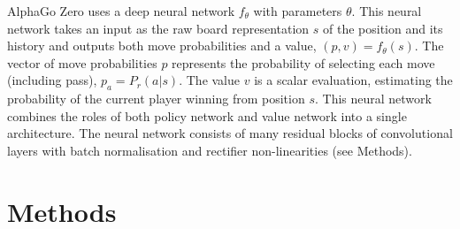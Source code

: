 \documentclass[12pt,a4paper]{article}
\begin{document}
AlphaGo Zero uses a deep neural network \(f_\theta\) with parameters \(\theta\). This neural network takes an input as the raw board representation \(s\) of the position and its history and outputs both move probabilities and a value, \((p, v) = f_\theta(s)\). The vector of move probabilities \(p\) represents the probability of selecting each move (including pass), \(p_a = P_r(a|s)\). The value \(v\) is a scalar evaluation, estimating the probability of the current player winning from position \(s\). This neural network combines the roles of both policy network and value network\cite{AlphaGo} into a single architecture. The neural network consists of many residual blocks\cite{ResNet} of convolutional layers\cite{CNNpaper} with batch normalisation\cite{BN} and rectifier non-linearities\cite{ReLU} (see Methods).\par
\clearpage
\section{Methods}
\end{document}
